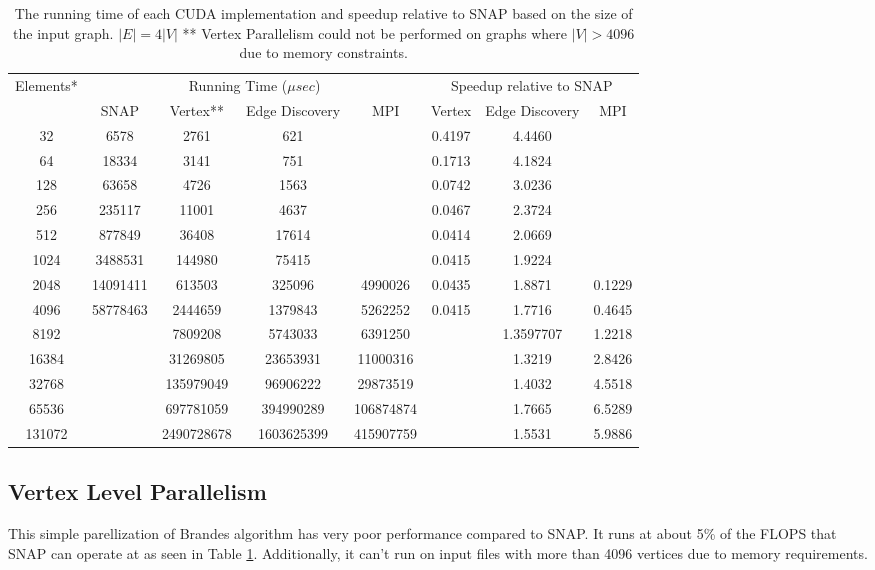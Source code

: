 \documentclass[10pt,twocolumn]{article}
\begin{document}
\begin{table}[h]
\centering
\label{tbl:compare}
\begin{tabular}{|c|c|c|c|c|c|c|c|}
\hline
\multirow{2}{*}{Elements*}& \multicolumn{4}{c|}{Running Time ($\mu sec$)} & \multicolumn{3}{c|}{Speedup relative to SNAP}\\\cline{2-8}
&SNAP&Vertex**&Edge Discovery&MPI&Vertex&Edge Discovery&MPI\\\hline
32 & 6578 & 2761 & 621 &  & 0.4197 & 4.4460 & \\\hline
64 & 18334 & 3141 & 751 &  & 0.1713 & 4.1824 & \\\hline
128 & 63658 & 4726 & 1563 &  & 0.0742 & 3.0236 & \\\hline
256 & 235117 & 11001 & 4637 &  & 0.0467 & 2.3724 & \\\hline
512 & 877849 & 36408 & 17614 &  & 0.0414 & 2.0669 & \\\hline
1024 & 3488531 & 144980 & 75415 &  & 0.0415 & 1.9224 & \\\hline
2048 & 14091411 & 613503 & 325096 & 4990026 & 0.0435 & 1.8871 & 0.1229\\\hline
4096 & 58778463 & 2444659 & 1379843 & 5262252 & 0.0415 & 1.7716 & 0.4645\\\hline
8192 &  & 7809208 & 5743033 & 6391250 &  & 1.3597707 & 1.2218\\\hline
16384 &  & 31269805 & 23653931 & 11000316 &  & 1.3219 & 2.8426\\\hline
32768 &  & 135979049 & 96906222 & 29873519 &  & 1.4032 & 4.5518\\\hline
65536 &  & 697781059 & 394990289 & 106874874 &  & 1.7665 & 6.5289\\\hline
131072 &  & 2490728678 & 1603625399 & 415907759 &  & 1.5531 & 5.9886\\\hline
\end{tabular}
\caption{The running time of each CUDA implementation and speedup relative to SNAP based on the size of the input graph.\newline
{\scriptsize *$|E| = 4|V|$ \newline
** Vertex Parallelism could not be performed on graphs where $|V|>4096$ due to memory constraints.}
}
\end{table}

\subsection{Vertex Level Parallelism}
This simple parellization of Brandes algorithm has very poor performance compared to SNAP. It runs at about 5\% of the FLOPS that SNAP can operate at as seen in Table \ref{tbl:compare}. Additionally, it can't run on input files with more than 4096 vertices due to memory requirements.
\end{document}
